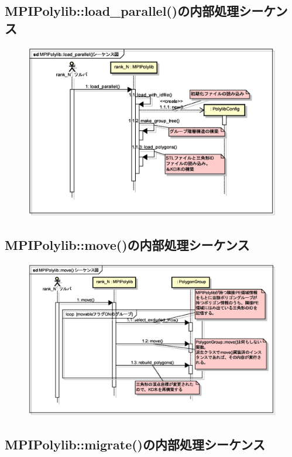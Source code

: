 {\pagebreak
%
\subsection{MPIPolylib::load\_parallel()の内部処理シーケンス}

\begin{figure}[H]
 \centering
 \includegraphics[width=13cm]{clip018.eps}
\end{figure}

%
\subsection{MPIPolylib::move()の内部処理シーケンス}

\begin{figure}[H]
 \centering
 \includegraphics[width=13cm]{clip019.eps}
\end{figure}


\pagebreak
%
\subsection{MPIPolylib::migrate()の内部処理シーケンス}

}
